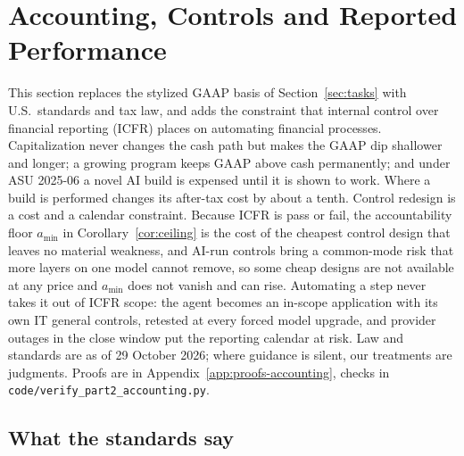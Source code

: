 \section{Accounting, Controls and Reported Performance}\label{sec:accounting}

This section replaces the stylized GAAP basis of Section~\ref{sec:tasks} with U.S.\ standards and tax law, and adds the constraint that internal control over financial reporting (ICFR) places on automating financial processes. Capitalization never changes the cash path but makes the GAAP dip shallower and longer; a growing program keeps GAAP above cash permanently; and under ASU 2025-06 a novel AI build is expensed until it is shown to work. Where a build is performed changes its after-tax cost by about a tenth. Control redesign is a cost and a calendar constraint. Because ICFR is pass or fail, the accountability floor $a_{\min}$ in Corollary~\ref{cor:ceiling} is the cost of the cheapest control design that leaves no material weakness, and AI-run controls bring a common-mode risk that more layers on one model cannot remove, so some cheap designs are not available at any price and $a_{\min}$ does not vanish and can rise. Automating a step never takes it out of ICFR scope: the agent becomes an in-scope application with its own IT general controls, retested at every forced model upgrade, and provider outages in the close window put the reporting calendar at risk. Law and standards are as of 29 October 2026; where guidance is silent, our treatments are judgments. Proofs are in Appendix~\ref{app:proofs-accounting}, checks in \texttt{code/verify\_part2\_accounting.py}.

\subsection{What the standards say}\label{sec:acct-standards}

